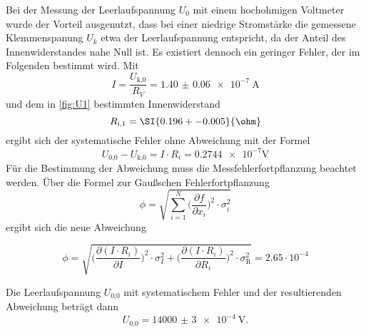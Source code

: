   Bei der Messung der Leerlaufspannung $U_0$ mit einem hochohmigen Voltmeter
  wurde der Vorteil ausgenutzt, dass bei einer niedrige Stromstärke die
  gemessene Klemmenspanung $U_k$ etwa der Leerlaufspannung entspricht, da
  der Anteil des Innenwiderstandes nahe Null ist.
  Es existiert dennoch ein geringer Fehler, der im Folgenden bestimmt wird.
  Mit
  \begin{equation}
    I = \frac{U_\text{k,0}}{R_V} = \SI{1.40(6)e-7}{\A}
  \end{equation}
  und dem in \ref{fig:U1} bestimmten Innenwiderstand
  \begin{equation}
    R_\text{i,1} = \SI{0.196 +- 0.005}{\ohm}
  \end{equation}
  ergibt sich der systematische Fehler ohne Abweichung mit der Formel
  \begin{equation}
    U_\text{0,0} - U_\text{k,0} = I \cdot R_i = \num{0.2744e-7} \si{\V}
  \end{equation}
  Für die Bestimmung der Abweichung muss die Messfehlerfortpflanzung
  beachtet werden. Über die Formel zur Gaußschen Fehlerfortpflanzung
  \begin{equation}
    \phi = \sqrt{\sum_{i=1}^{N} \biggl(\frac{\partial f}{\partial x_i}\biggr)^2
    \cdot \sigma_i^2}
  \end{equation}
  ergibt sich die neue Abweichung

  \begin{equation}
    \phi = \sqrt{\biggl(\frac{\partial(I \cdot R_i)}{\partial I}\biggr)^2
    \cdot \sigma_I^2
    + \biggl(\frac{\partial(I \cdot R_i)}{\partial R_i}\biggr)^2
    \cdot \sigma_\text{R}^2}
    = 2.65 \cdot 10^{-4}
  \end{equation}

  Die Leerlaufspannung $U_\text{0,0}$ mit systematischem Fehler und der
  resultierenden Abweichung beträgt dann
  \begin{equation}
    U_\text{0,0} = \SI{14000(3)e-4}{\V}.
  \end{equation}


  \newpage
